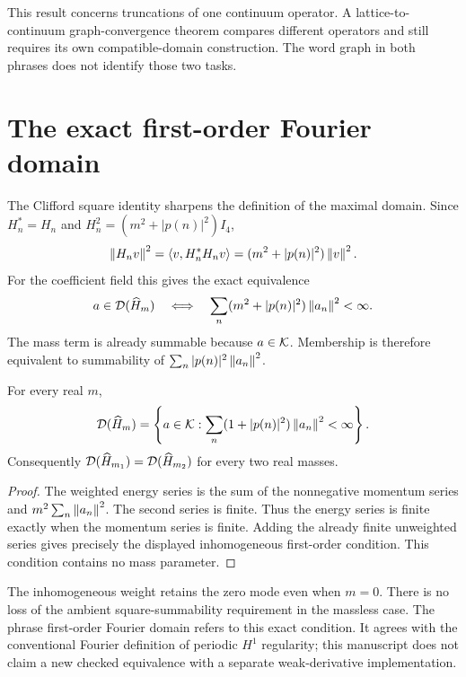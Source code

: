 
This result concerns truncations of one continuum operator. A lattice-to-continuum graph-convergence theorem compares different operators and still requires its own compatible-domain construction. The word graph in both phrases does not identify those two tasks.

\section{The exact first-order Fourier domain}
The Clifford square identity sharpens the definition of the maximal domain. Since $H_n^*=H_n$ and $H_n^2=(m^2+|p(n)|^2)I_4$,
\[
\left\lVert H_nv\right\rVert^2
=\left\langle v,H_n^*H_nv\right\rangle
=(m^2+|p(n)|^2)\left\lVert v\right\rVert^2.
\]
For the coefficient field this gives the exact equivalence
\[
a\in\mathcal D(\widehat H_m)
\quad\Longleftrightarrow\quad
\sum_n(m^2+|p(n)|^2)\left\lVert a_n\right\rVert^2<\infty.
\]
The mass term is already summable because $a\in\mathcal K$. Membership is therefore equivalent to summability of $\sum_n|p(n)|^2\left\lVert a_n\right\rVert^2$.

\begin{theorem}
For every real $m$,
\[
\mathcal D(\widehat H_m)
=\left\{a\in\mathcal K:
\sum_n(1+|p(n)|^2)\left\lVert a_n\right\rVert^2<\infty\right\}.
\]
Consequently $\mathcal D(\widehat H_{m_1})=\mathcal D(\widehat H_{m_2})$ for every two real masses.
\end{theorem}
\begin{proof}
The weighted energy series is the sum of the nonnegative momentum series and $m^2\sum_n\left\lVert a_n\right\rVert^2$. The second series is finite. Thus the energy series is finite exactly when the momentum series is finite. Adding the already finite unweighted series gives precisely the displayed inhomogeneous first-order condition. This condition contains no mass parameter.
\end{proof}


The inhomogeneous weight retains the zero mode even when $m=0$. There is no loss of the ambient square-summability requirement in the massless case. The phrase first-order Fourier domain refers to this exact condition. It agrees with the conventional Fourier definition of periodic $H^1$ regularity; this manuscript does not claim a new checked equivalence with a separate weak-derivative implementation.

